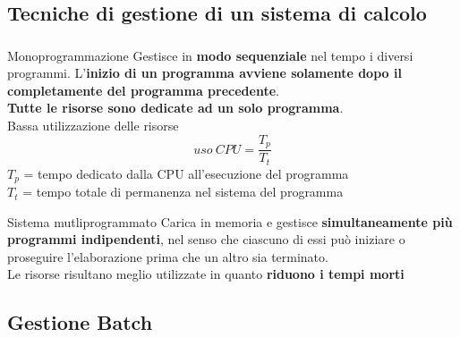\documentclass{beamer}
\newenvironment{mainframe}{
	\begin{frame}
		\frametitle{\insertsubsection}
		\framesubtitle{\insertsection}
	}{
	\end{frame}
}
\begin{document}
\subsection{Tecniche di gestione di un sistema di calcolo}
\begin{mainframe}
	\begin{block}{Monoprogrammazione}
		Gestisce in \textbf{modo sequenziale} nel tempo i diversi programmi. L'\textbf{inizio di un programma avviene solamente dopo il completamente del programma precedente}.\\
		\textbf{Tutte le risorse sono dedicate ad un solo programma}.\\
		Bassa utilizzazione delle risorse
		$$uso \ CPU = \frac{T_p}{T_t}$$
		$T_p$ = tempo dedicato dalla CPU all'esecuzione del programma\\
		$T_t$ = tempo totale di permanenza nel sistema del programma
	\end{block}
\end{mainframe}
\begin{frame}
	\begin{block}{Sistema mutliprogrammato}
		Carica in memoria e gestisce \textbf{simultaneamente più programmi indipendenti}, nel senso che ciascuno di essi può iniziare o proseguire l'elaborazione prima che un altro sia terminato.\\
		Le risorse risultano meglio utilizzate in quanto \textbf{riduono i tempi morti}
	\end{block}
\end{frame}
\subsection{Gestione Batch}
\end{document}
